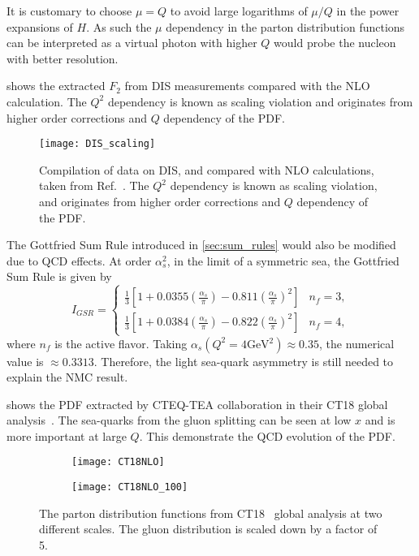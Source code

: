 \documentclass[../main.tex]{subfiles}
\begin{document}
It is customary to choose $\mu =Q$ to avoid large logarithms of $\mu /Q$ in the
power expansions of $H$. As such the $\mu$ dependency in the parton distribution
functions can be interpreted as a virtual photon with higher $Q$ would probe the
nucleon with better resolution.

 shows the extracted $F_2$ from DIS measurements compared
with the NLO calculation. The $Q^2$ dependency is known as scaling violation and
originates from higher order corrections and $Q$ dependency of the PDF.
\begin{figure}[h!]
	\centering
	\texttt{[image: DIS\_scaling]}
	\caption{
		Compilation of data on DIS, and compared with NLO calculations,
		taken from Ref.~\cite{adloff2003}.
		The $Q^2$ dependency is known as scaling violation,
		and originates from higher order corrections and $Q$ dependency of the PDF.
	}
	\label{fig:DIS_scaling}
\end{figure}
The Gottfried Sum Rule introduced in \cref{sec:sum_rules} would also be modified due to
QCD effects. At order $\alpha_s^2$, in the limit of a symmetric sea, the Gottfried Sum Rule
is given by~\cite{kataev2003}
\begin{equation}
	I_{GSR} = \begin{cases}
		\frac{1}{3}\left[ 1 + 0.0355\left(\frac{\alpha_s}{\pi}\right)-0.811\left(\frac{\alpha_s}{\pi}\right)^2 \right] & n_f=3, \\
		\frac{1}{3}\left[ 1 + 0.0384\left(\frac{\alpha_s}{\pi}\right)-0.822\left(\frac{\alpha_s}{\pi}\right)^2 \right] & n_f=4,
	\end{cases}
\end{equation}
where $n_f$ is the active flavor.
Taking $\alpha_s(Q^2=4\unit{\GeV^2})\approx 0.35$, the numerical value is $\approx 0.3313$. Therefore,
the light sea-quark asymmetry is still needed to explain the NMC result.

 shows the PDF extracted by CTEQ-TEA collaboration in their
CT18 global analysis~\cite{hou2021}. The sea-quarks from the gluon splitting
can be seen at low $x$ and is more important at large $Q$. This demonstrate the
QCD evolution of the PDF.

\begin{figure}
	\centering
	\begin{subfigure}{0.48\linewidth}
		\texttt{[image: CT18NLO]}
	\end{subfigure}
	\begin{subfigure}{0.48\linewidth}
		\texttt{[image: CT18NLO\_100]}
	\end{subfigure}
	\caption{The parton distribution functions from CT18~\cite{hou2021} global analysis at two different scales.
		The gluon distribution is scaled down by a factor of 5.}
	\label{fig:CT18_scale}
\end{figure}
\end{document}
